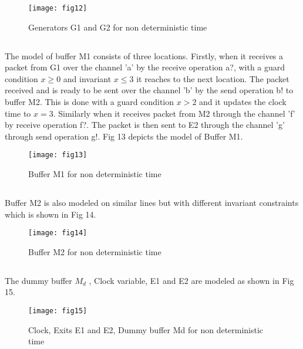 \documentclass[letterpaper]{article}
\begin{document}
\begin{figure}[bpht!]
\centering
	\texttt{[image: fig12]}
		\caption{Generators G1 and G2  for non deterministic time}
	\label{Fig12}
\end{figure}

\subsection{} The model of buffer M1 consists of three locations. Firstly, when it receives a packet 	from G1 over the channel 'a' by the receive operation a?, with a guard condition $x\geq 0$ and invariant $x\leq 3$ it reaches to the next location. The packet received and is ready to be sent over the channel 'b' by the send operation b! to buffer M2. This is done with a guard condition $x>2$ and it updates the clock time to $x=3$. Similarly when it receives packet from M2 through the channel 'f' by receive operation f?. The packet is then sent to E2 through the channel 'g' through send operation g!. Fig 13 depicts the model of Buffer M1.

\begin{figure}[bpht!]
\centering
	\texttt{[image: fig13]}
		\caption{Buffer M1 for non deterministic time}
	\label{Fig13}
\end{figure}
	
\subsection{} Buffer M2 is also modeled on similar lines but with different invariant constraints which is shown in Fig 14.

\begin{figure}[bpht!]
\centering
	\texttt{[image: fig14]}
		\caption{Buffer M2 for non deterministic time}
	\label{Fig14}
	\end{figure}
	
\subsection{} The dummy buffer $M_{d}$ , Clock variable, E1 and E2 are modeled as shown in Fig 15.

\begin{figure}[bpht!]
\centering
	\texttt{[image: fig15]}
		\caption{Clock, Exits E1 and E2, Dummy buffer Md for non deterministic time}
	\label{Fig15}
\end{figure}
\end{document}

